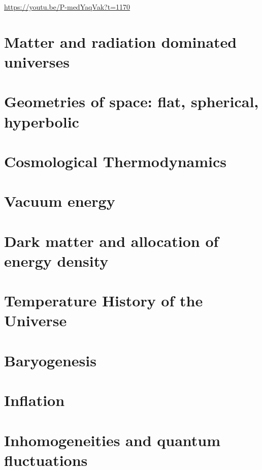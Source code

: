 \documentclass[]{article}
\begin{document}
\url{https://youtu.be/P-medYaqVak?t=1170}

\section{Matter and radiation dominated universes}
\section{Geometries of space: flat, spherical, hyperbolic}
\section{Cosmological Thermodynamics}
\section{Vacuum energy}
\section{Dark matter and allocation of energy density}
\section{Temperature History of the Universe}
\section{Baryogenesis}
\section{Inflation}
\section{Inhomogeneities and quantum fluctuations}



\raggedright

\end{document}
